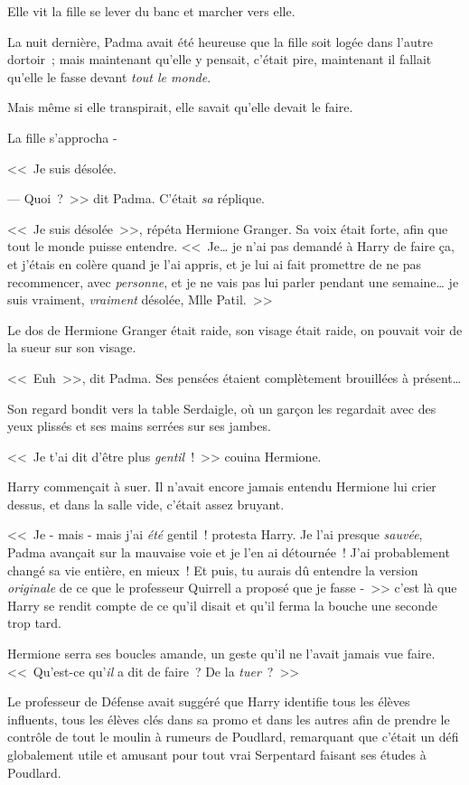 Elle vit la fille se lever du banc et marcher vers elle.

La nuit dernière, Padma avait été heureuse que la fille soit logée dans l'autre dortoir~; mais maintenant qu'elle y pensait, c'était pire, maintenant il fallait qu'elle le fasse devant \emph{tout le monde}.

Mais même si elle transpirait, elle savait qu'elle devait le faire.

La fille s'approcha -

<<~Je suis désolée.

--- Quoi~?~>> dit Padma. C'était \emph{sa} réplique.

<<~Je suis désolée~>>, répéta Hermione Granger. Sa voix était forte, afin que tout le monde puisse entendre. <<~Je… je n'ai pas demandé à Harry de faire ça, et j'étais en colère quand je l'ai appris, et je lui ai fait promettre de ne pas recommencer, avec \emph{personne}, et je ne vais pas lui parler pendant une semaine… je suis vraiment, \emph{vraiment} désolée, Mlle Patil.~>>

Le dos de Hermione Granger était raide, son visage était raide, on pouvait voir de la sueur sur son visage.

<<~Euh~>>, dit Padma. Ses pensées étaient complètement brouillées à présent…

Son regard bondit vers la table Serdaigle, où un garçon les regardait avec des yeux plissés et ses mains serrées sur ses jambes.


<<~Je t'ai dit d'être plus \emph{gentil}~!~>> couina Hermione.

Harry commençait à suer. Il n'avait encore jamais entendu Hermione lui crier dessus, et dans la salle vide, c'était assez bruyant.

<<~Je - mais - mais j'ai \emph{été} gentil~! protesta Harry. Je l'ai presque \emph{sauvée}, Padma avançait sur la mauvaise voie et je l'en ai détournée~! J'ai probablement changé sa vie entière, en mieux~! Et puis, tu aurais dû entendre la version \emph{originale} de ce que le professeur Quirrell a proposé que je fasse -~>> c'est là que Harry se rendit compte de ce qu'il disait et qu'il ferma la bouche une seconde trop tard.

Hermione serra ses boucles amande, un geste qu'il ne l'avait jamais vue faire. <<~Qu'est-ce qu'\emph{il} a dit de faire~? De la \emph{tuer}~?~>>

Le professeur de Défense avait suggéré que Harry identifie tous les élèves influents, tous les élèves clés dans sa promo et dans les autres afin de prendre le contrôle de tout le moulin à rumeurs de Poudlard, remarquant que c'était un défi globalement utile et amusant pour tout vrai Serpentard faisant ses études à Poudlard.

